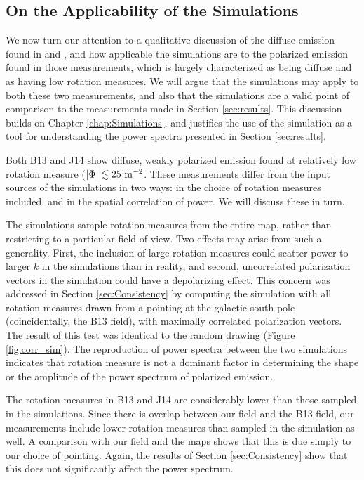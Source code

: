 \subsection{On the Applicability of the Simulations}\label{sec:applicable}

We now turn our attention to a qualitative discussion of the diffuse emission found in
\citet[][B13]{Bernardi2013} and \citet[][J14]{Jelic2014}, and how applicable the simulations are to
the polarized emission found in those measurements, which is largely characterized as being diffuse
and as having low rotation measures. We will argue that the simulations may apply to both these two
measurements, and also that the simulations are a valid point of comparison to the measurements made
in Section \ref{sec:results}. This discussion builds on Chapter \ref{chap:Simulations}, and justifies
the use of the simulation as a tool for understanding the power spectra presented in Section
\ref{sec:results}.

Both B13 and J14 show diffuse, weakly polarized emission found at relatively low rotation measure
($|\Phi| \lesssim 25\ {\rm m}^{-2}$. These measurements differ from the input sources of the
simulations in two ways: in the choice of rotation measures included, and in the spatial
correlation of power. We will discuss these in turn.

The simulations sample rotation measures from the entire \citet{Oppermann2012} map, rather than
restricting to a particular field of view. Two effects may arise from such a generality. First, the
inclusion of large rotation measures could scatter power to larger $k$ in the simulations than in
reality, and second, uncorrelated polarization vectors in the simulation could have a depolarizing
effect. This concern was addressed in Section \ref{sec:Consistency} by computing the simulation with
all rotation measures drawn from a pointing at the galactic south pole (coincidentally, the B13
field), with maximally correlated polarization vectors. The result of this test was identical to the
random drawing (Figure \ref{fig:corr_sim}). The reproduction of power spectra between the two
simulations indicates that rotation measure is not a dominant factor in determining the shape or the
amplitude of the power spectrum of polarized emission. 

The rotation measures in B13 and J14 are considerably lower than those sampled in the simulations.
Since there is overlap between our field and the B13 field, our measurements include lower
rotation measures than sampled in the simulation as well. A comparison with our field and the
\citet{Oppermann2012} maps shows that this is due simply to our choice of pointing. Again, the
results of Section \ref{sec:Consistency} show that this does not significantly affect the power
spectrum.

